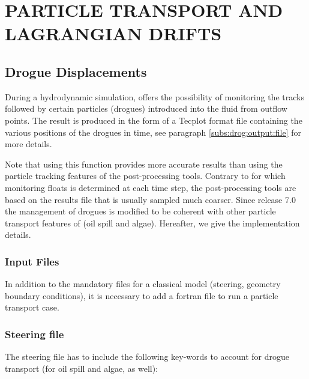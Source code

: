 \chapter{ PARTICLE TRANSPORT AND LAGRANGIAN DRIFTS}
\label{ch:part:transp}

\section{ Drogue Displacements}
\label{sec:drog:displ}
 During a hydrodynamic simulation,  offers the possibility of monitoring the tracks followed by certain particles (drogues) introduced into the fluid from outflow points. The result is produced in the form of a Tecplot format file containing the various positions of the drogues in time, see paragraph \ref{subs:drog:output:file} for more details.

 Note that using this function provides more accurate results than using the particle tracking features of the post-processing tools. Contrary to  for which monitoring floats is determined at each time step, the post-processing tools are based on the results file that is usually sampled much coarser. Since release 7.0 the management of drogues is modified to be coherent with other particle transport features of  (oil spill and algae). Hereafter, we give the implementation details.

\subsection{ Input Files}
\label{subs:drog:inp:fil}
 In addition to the mandatory files for a classical  model (steering, geometry boundary conditions), it is necessary to add a fortran file to run a particle transport case.

\subsection{ Steering file}
\label{subs:drog:steer:file}
 The steering file has to include the following key-words to account for drogue transport (for oil spill and algae, as well):

